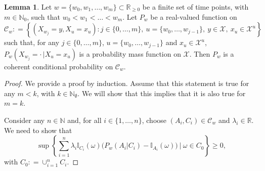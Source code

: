 \documentclass[10pt]{paper}
\theoremstyle{definition}
\newtheorem{lemma}[theorem]{Lemma}
\newcommand{\nats}{\mathbb{N}}
\newcommand{\reals}{\mathbb{R}}
\newcommand{\states}{\mathcal{X}}
\newcommand{\ind}[1]{\mathbb{I}_{#1}}
\newcommand{\coloneqq}{:\!=}
\begin{document}
\begin{lemma}\label{lemma:simplechaincoherence}
Let $w=\{w_0,w_1,\dots,w_m\}\subset\reals_{\geq0}$ be a finite set of time points, with $m\in\nats_0$, such that $w_0<w_1<\dots<w_m$.
Let $P_w$ be a real-valued function on
\begin{equation*}
\mathcal{C}_w\coloneqq
\left\{
(X_{w_j}=y,X_u=x_u)
\colon 
j\in\{0,\dots,m\},~
u=\{w_0,\dots,w_{j-1}\},~
y\in\states,~
x_u\in\states^u
\right\}
\end{equation*}
such that, for any $j\in\{0,\dots,m\}$, $u=\{w_0,\dots,w_{j-1}\}$ and $x_u\in\states^u$, $P_w(X_{w_j}=\cdot\,\vert X_u=x_u)$ is a probability mass function on $\states$. Then $P_w$ is a coherent conditional probability on $\mathcal{C}_w$.
\end{lemma}
\begin{proof}
We provide a proof by induction. Assume that this statement is true for any $m<k$, with $k\in\nats_\emptyset$. We will show that this implies that it is also true for $m=k$.

Consider any $n\in\nats$ and, for all $i\in\{1,\dots,n\}$, choose $(A_i,C_i)\in\mathcal{C}_w$ and $\lambda_i\in\reals$. We need to show that
\begin{equation}\label{eq:lemma:simplechaincoherence:TB}
\sup\left\{\sum_{i=1}^n\lambda_i\ind{C_i}(\omega)\bigl(P_w(A_i\vert C_i)-\ind{A_i}(\omega)\bigr)~\Bigg\vert~\omega\in C_0\right\}\geq0,
\end{equation}
with $C_0\coloneqq\cup_{i=1}^nC_i$. %


\end{proof}
\end{document}
